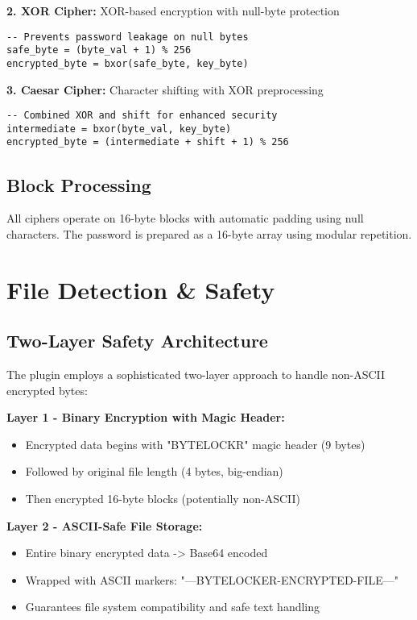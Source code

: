 \documentclass[11pt,a4paper]{article}
\begin{document}
\begin{multicols}{2}
\textbf{2. XOR Cipher:} XOR-based encryption with null-byte protection
\begin{lstlisting}[basicstyle=\ttfamily\tiny]
-- Prevents password leakage on null bytes
safe_byte = (byte_val + 1) % 256
encrypted_byte = bxor(safe_byte, key_byte)
\end{lstlisting}

\textbf{3. Caesar Cipher:} Character shifting with XOR preprocessing
\begin{lstlisting}[basicstyle=\ttfamily\tiny]
-- Combined XOR and shift for enhanced security
intermediate = bxor(byte_val, key_byte)
encrypted_byte = (intermediate + shift + 1) % 256
\end{lstlisting}

\subsection{Block Processing}
All ciphers operate on 16-byte blocks with automatic padding using null characters. The password is prepared as a 16-byte array using modular repetition.

\section{File Detection \& Safety}

\subsection{Two-Layer Safety Architecture}
The plugin employs a sophisticated two-layer approach to handle non-ASCII encrypted bytes:

\textbf{Layer 1 - Binary Encryption with Magic Header:}
\begin{itemize}
    \item Encrypted data begins with "BYTELOCKR" magic header (9 bytes)
    \item Followed by original file length (4 bytes, big-endian)
    \item Then encrypted 16-byte blocks (potentially non-ASCII)
\end{itemize}

\textbf{Layer 2 - ASCII-Safe File Storage:}
\begin{itemize}
    \item Entire binary encrypted data -> Base64 encoded
    \item Wrapped with ASCII markers: "---BYTELOCKER-ENCRYPTED-FILE---"
    \item Guarantees file system compatibility and safe text handling
\end{itemize}


\end{multicols}
\end{document}
